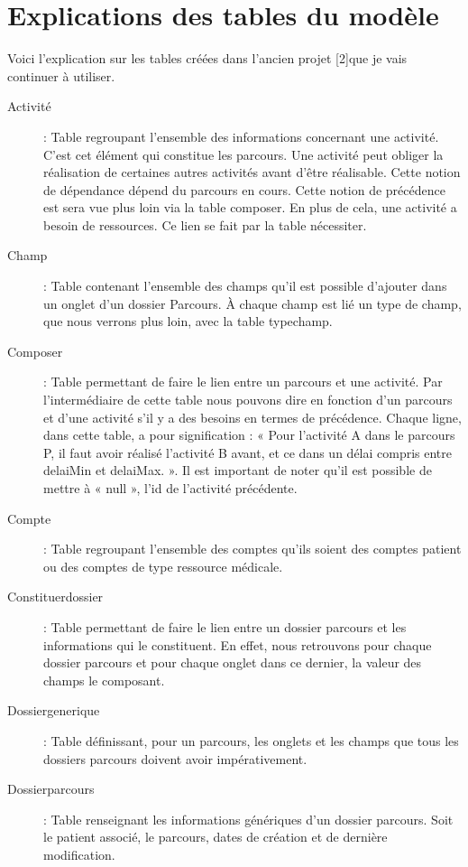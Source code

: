 \documentclass{polytech/polytech}
\begin{document}
\chapter{Explications des tables du modèle}
\label{ann:expModele}


Voici l'explication sur les tables créées dans l'ancien projet [2]que je vais continuer à utiliser.

\begin{description}
	\item[Activité] : Table regroupant l'ensemble des informations concernant une activité. C'est cet élément qui constitue les parcours. Une activité peut obliger la réalisation de certaines autres activités avant d'être réalisable. Cette notion de dépendance dépend du parcours en cours. Cette notion de précédence est sera vue plus loin via la table composer. En plus de cela, une activité a besoin de ressources. Ce lien se fait par la table nécessiter.
	\item[Champ] : Table contenant l'ensemble des champs qu'il est possible d'ajouter dans un onglet d'un dossier Parcours. À chaque champ est lié un type de champ, que nous verrons plus loin, avec la table typechamp.
	\item[Composer] : Table permettant de faire le lien entre un parcours et une activité. Par l'intermédiaire de cette table nous pouvons dire en fonction d'un parcours et d'une activité s'il y a des besoins en termes de précédence. Chaque ligne, dans cette table, a pour signification : « Pour l'activité A dans le parcours P, il faut avoir réalisé l'activité B avant, et ce dans un délai compris entre delaiMin et delaiMax. ». Il est important de noter qu'il est possible de mettre à « null », l'id de l'activité précédente.
	\item[Compte] : Table regroupant l'ensemble des comptes qu'ils soient des comptes patient ou des comptes de type ressource médicale.
	\item[Constituerdossier] : Table permettant de faire le lien entre un dossier parcours et les informations qui le constituent. En effet, nous retrouvons pour chaque dossier parcours et pour chaque onglet dans ce dernier, la valeur des champs le composant.
	\item[Dossiergenerique] : Table définissant, pour un parcours, les onglets et les champs que tous les dossiers parcours doivent avoir impérativement.
	\item[Dossierparcours] : Table renseignant les informations génériques d'un dossier parcours. Soit le patient associé, le parcours, dates de création et de dernière modification.

\end{description}
\end{document}

